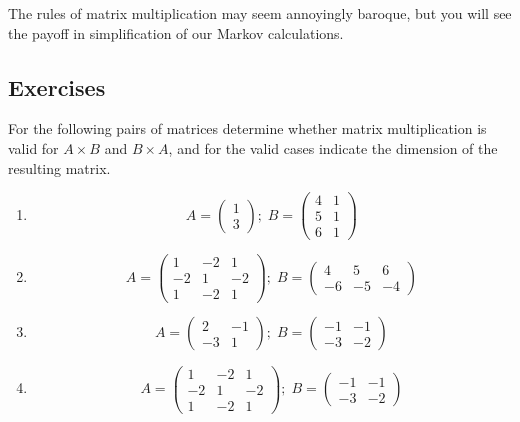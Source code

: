 \documentclass[
  letterpaper,
  DIV=11,
  numbers=noendperiod]{scrreprt}
\begin{document}
The rules of matrix multiplication may seem annoyingly baroque, but you
will see the payoff in simplification of our Markov calculations.

\hypertarget{exercises-33}{%
\subsection{Exercises}\label{exercises-33}}

For the following pairs of matrices determine whether matrix
multiplication is valid for \(A \times B\) and \(B \times A\), and for
the valid cases indicate the dimension of the resulting matrix.

\begin{enumerate}
\def\labelenumi{\arabic{enumi}.}
\item
  \[ 
  A =  \left(\begin{array}{c}1 \\ 3 \end{array}\right);  \;  B = \left(\begin{array}{cc}4 & 1 \\5 & 1 \\6 & 1\end{array}\right)
  \]
\item
  \[ 
  A =   \left(\begin{array}{ccc}1 & -2 & 1 \\-2 & 1 & -2 \\1 & -2 & 1\end{array}\right);  \;  B = \left(\begin{array}{ccc}4 & 5 & 6 \\-6 & -5 & -4\end{array}\right)
  \]
\item
  \[ 
  A =  \left(\begin{array}{cc}2 & -1 \\-3 & 1\end{array}\right)  ;  \;  B = \left(\begin{array}{cc}-1 & -1 \\-3 & -2\end{array}\right)
  \]
\item
  \[ A =   \left(\begin{array}{ccc}1 & -2 & 1 \\-2 & 1 & -2 \\1 & -2 & 1\end{array}\right)  ;  \;  B =  \left(\begin{array}{cc}-1 & -1 \\-3 & -2\end{array}\right)
\]
\end{enumerate}
\end{document}
